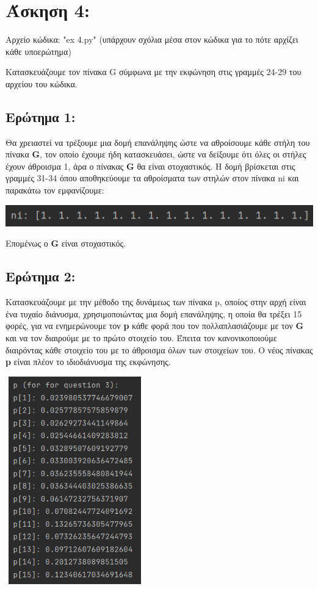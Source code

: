 \documentclass{article}
\begin{document}
\section{Άσκηση 4:}

Αρχείο κώδικα: "ex 4.py" (υπάρχουν σχόλια μέσα στον κώδικα για το πότε αρχίζει κάθε υποερώτημα)

Κατασκευάζουμε τον πίνακα G σύμφωνα με την εκφώνηση στις γραμμές 24-29 του αρχείου του κώδικα.

\subsection{Ερώτημα 1:}
Θα χρειαστεί να τρέξουμε μια δομή επανάληψης ώστε να αθροίσουμε κάθε στήλη του πίνακα \textbf{G}, τον οποίο έχουμε ήδη κατασκευάσει, ώστε να δείξουμε ότι όλες οι στήλες έχουν άθροισμα 1, άρα ο πίνακας \textbf{G} θα είναι στοχαστικός. Η δομή βρίσκεται στις γραμμές 31-34 όπου αποθηκεύουμε τα αθροίσματα των στηλών στον πίνακα ni και παρακάτω τον εμφανίζουμε:

\begin{center}\includegraphics[]{images/results_25.png}\end{center}

Επομένως ο \textbf{G} είναι στοχαστικός.

\subsection{Ερώτημα 2:}
Κατασκευάζουμε με την μέθοδο της δυνάμεως των πίνακα p, οποίος στην αρχή είναι ένα τυχαίο διάνυσμα, χρησιμοποιώντας μια δομή επανάληψης, η οποία θα τρέξει 15 φορές, για να ενημερώνουμε τον \textbf{p} κάθε φορά που τον πολλαπλασιάζουμε με τον \textbf{G} και να τον διαιρούμε με το πρώτο στοιχείο του. Έπειτα τον κανονικοποιούμε διαιρόντας κάθε στοιχείο του με το άθροισμα όλων των στοιχείων του. Ο νέος πίνακας \textbf{p} είναι πλέον το ιδιοδιάνυσμα της εκφώνησης.

\begin{center}\includegraphics[width = 6cm, height = 9cm]{images/results_30.png}\end{center}
    
\end{document}
